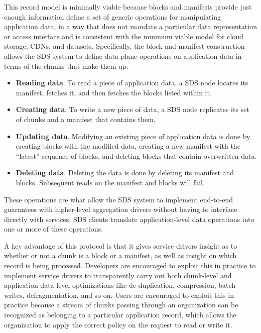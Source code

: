 This record model is minimally viable because blocks
and manifests provide just enough information define a
set of generic operations for manipulating application data, in a way that
does not mandate a particular data representation or access interface and is
consistent with the minimum viable model for cloud storage, CDNs, and datasets.
Specifically, the block-and-manifest construction allows
the SDS system to define data-plane operations on
application data in terms of the chunks that make them up:

\begin{itemize}
   \item \textbf{Reading data}.  To read a piece of application data, a SDS node locates
    its manifest, fetches it, and then fetches the blocks listed within it.

   \item \textbf{Creating data}.  To write a new piece of data, a SDS node replicates
    its set of chunks and a manifest that contains them.

   \item \textbf{Updating data}.  Modifying an existing
    piece of application data is done by creating blocks with the modified data,
    creating a new manifest with the ``latest'' sequence of blocks, and deleting
    blocks that contain overwritten data.

   \item \textbf{Deleting data}.  Deleting the data is done by
    deleting its manifest and blocks.  Subsequent reads on the manifest and
    blocks will fail.
\end{itemize}

These operations are what allow the SDS system to implement end-to-end
guarantees with higher-level aggregation drivers without having to interface
directly with services.  SDS clients translate application-level data
operations into one or more of these operations.

A key advantage of this protocol is that it gives service drivers insight as to whether or not a
chunk is a block or a manifest, as well as insight on which 
record is being processed.  Developers are encouraged to exploit this in practice to implement
service drivers to transparently carry out both chunk-level and application
data-level optimizations like de-duplication, compression, batch-writes,
defragmentation, and so on.  Users are encouraged to exploit this in practice
because a stream of chunks passing through an organization can be recognized as
belonging to a particular application record, which allows the organization to
apply the correct policy on the request to read or write it.

